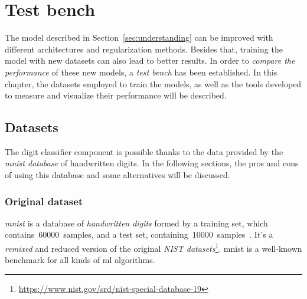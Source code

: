 \chapter{Test bench}\label{ch:benchmark}
The model described in Section~\ref{sec:understanding} can be improved with different architectures and regularization methods. Besides that, training the model with new datasets can also lead to better results. In order to \emph{compare the performance} of these new models, a \emph{test bench} has been established. In this chapter, the datasets employed to train the models, as well as the tools developed to measure and visualize their performance will be described.

\section{Datasets}\label{sec:datasets}
The digit classifier component is possible thanks to the data provided by the \emph{\gls{mnist} database} of handwritten digits. In the following sections, the pros and cons of using this database and some alternatives will be discussed.

\subsection{Original dataset}\label{subsec:MNIST}
\emph{\gls{mnist}} is a database of \emph{handwritten digits} formed by a training set, which contains~60000~samples, and a test set, containing~10000~samples~\cite{lecun-mnisthandwrittendigit-2010}. It's a \textit{remixed} and reduced version of the original \emph{NIST datasets}\footnote{\url{https://www.nist.gov/srd/nist-special-database-19}}. \gls{mnist} is a well-known benchmark for all kinds of \gls{ml} algorithms.

